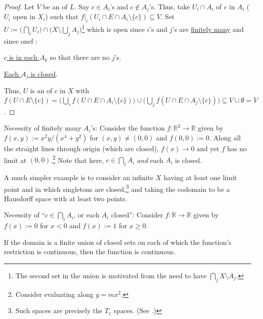 	\begin{proof}
		Let $V$ be an \onbd of $L$. Say $c\in A_i$'s and $c\notin A_j$'s. Thus, take  $U_i\cap A_i$ of $c$ in $A_i$ ($U_i$ open in $X_i$) such that $f|_i(U_i\cap E\cap A_i\setminus\{c\})\subseteq V$. Set $U := \bigl( \bigcap_i U_i \bigr)\cap \bigl(X\setminus \bigcup_j A_j\bigr)$\footnote{
			The second set in the union is motivated from the need to have $\bigcap_j X\setminus A_j$.
		} which is open since $i$'s and $j$'s are \uline{finitely many} and since onef :
		\begin{mylist}
			\item \uline{$c$ is in each $A_k$} so that there are no $j$'s.
			\item \uline{Each $A_j$ is closed}.
		\end{mylist}
		Thus, $U$ is an \onbd of $c$ in $X$ with $f(U\cap E\setminus\{c\}) 
		= \bigl( \bigcup_i f(U\cap E\cap A_i\setminus\{c\}) \bigr)
			\cup \bigl( \bigcup_j f(U\cap E\cap A_j\setminus\{c\}) \bigr)
		\subseteq V\cup \emptyset = V$.
	\end{proof}
	
	\begin{rmk}
		\begin{mylist}
			\item Necessity of finitely many $A_i$'s: 
			Consider the function $f\colon \mathbb R^2\to\mathbb R$ given by $f(x, y) := x^2y/(x^4 + y^2)$ for $(x, y)\ne (0, 0)$ and $f(0, 0) := 0$. Along all the straight lines through origin (which are closed), $f(x)\to 0$ and yet $f$ has no limit at $(0, 0)$.\footnote{
				Consider evaluating along $y = mx^2$.
			} Note that here, $c\in \bigcap_i A_i$ \emph{and} each $A_i$ is closed.
			
			A much simpler example is to consider an infinite $X$ having at least one limit point and in which singletons are closed,\footnote{
				Such spaces are precisely the $T_1$ spaces. (See .)
			} and taking the codomain to be a Hausdorff space with at least two points.
			
			
			\item Necessity of ``$c\in\bigcap_i A_i$, or each $A_i$ closed'': Consider $f\colon \mathbb{R\to R}$ given by $f(x) := 0$ for $x < 0$ and $f(x) := 1$ for $x\ge 0$.
		\end{mylist}
	\end{rmk}
	
	\begin{cor}
		If the domain is a finite union of closed sets on each of which the function's restriction is continuous, then the function is continuous.
	\end{cor}
	
